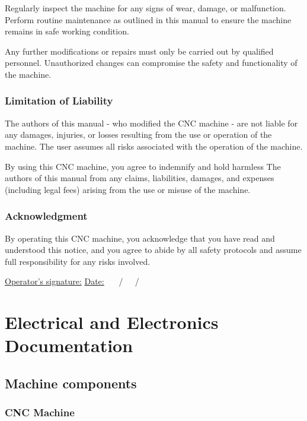 \documentclass[11pt, openright]{book}
\begin{document}
        Regularly inspect the machine for any signs of wear, damage, or malfunction. Perform routine maintenance as outlined in this manual to ensure the machine remains in safe working condition.

        Any further modifications or repairs must only be carried out by qualified personnel. Unauthorized changes can compromise the safety and functionality of the machine.
    
     \subsubsection{Limitation of Liability}

     The authors of this manual - who modified the CNC machine - are not liable for any damages, injuries, or losses resulting from the use or operation of the machine. The user assumes all risks associated with the operation of the machine. 

     By using this CNC machine, you agree to indemnify and hold harmless The authors of this manual from any claims, liabilities, damages, and expenses (including legal fees) arising from the use or misuse of the machine.

      \subsubsection{Acknowledgment}

      By operating this CNC machine, you acknowledge that you have read and understood this notice, and you agree to abide by all safety protocols and assume full responsibility for any risks involved.

      \hfill \ul{Operator's signature:} \hfill\hfill \ul{Date:} \hspace{10pt} \ul{$\quad\ \ $}/\ul{$\quad\ \ $}/\ul{$\qquad\ \ $} \hspace{50pt}

      \newpage

       \section{Electrical and Electronics Documentation }

        \subsection{Machine components}

         \subsubsection{CNC Machine}
\end{document}
